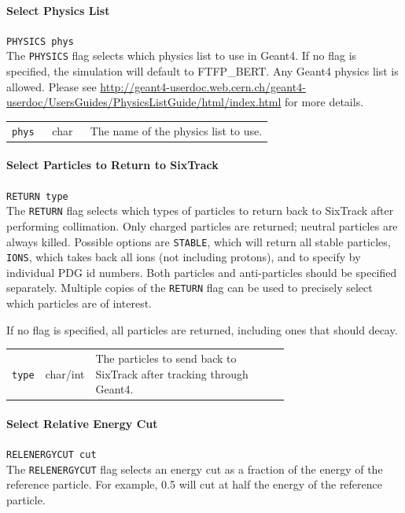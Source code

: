 \paragraph{Select Physics List} \texttt{PHYSICS phys}\\

The \texttt{PHYSICS} flag selects which physics list to use in Geant4.
If no flag is specified, the simulation will default to FTFP\_BERT.
Any Geant4 physics list is allowed.
Please see \url{http://geant4-userdoc.web.cern.ch/geant4-userdoc/UsersGuides/PhysicsListGuide/html/index.html} for more details.

\bigskip
\begin{tabular}{@{}llp{0.7\linewidth}}
    \texttt{phys} & char    & The name of the physics list to use.
\end{tabular}

\paragraph{Select Particles to Return to SixTrack} \texttt{RETURN type}\\

The \texttt{RETURN} flag selects which types of particles to return back to SixTrack after performing collimation.
Only charged particles are returned; neutral particles are always killed.
Possible options are \texttt{STABLE}, which will return all stable particles, \texttt{IONS}, which takes back all ions (not including protons), and to specify by individual PDG id numbers.
Both particles and anti-particles should be specified separately.
Multiple copies of the \texttt{RETURN} flag can be used to precisely select which particles are of interest.

If no flag is specified, all particles are returned, including ones that should decay.

\bigskip
\begin{tabular}{@{}llp{0.7\linewidth}}
    \texttt{type} & char/int & The particles to send back to SixTrack after tracking through Geant4.
\end{tabular}

\paragraph{Select Relative Energy Cut} \texttt{RELENERGYCUT cut}\\

The \texttt{RELENERGYCUT} flag selects an energy cut as a fraction of the energy of the reference particle.
For example, 0.5 will cut at half the energy of the reference particle.

